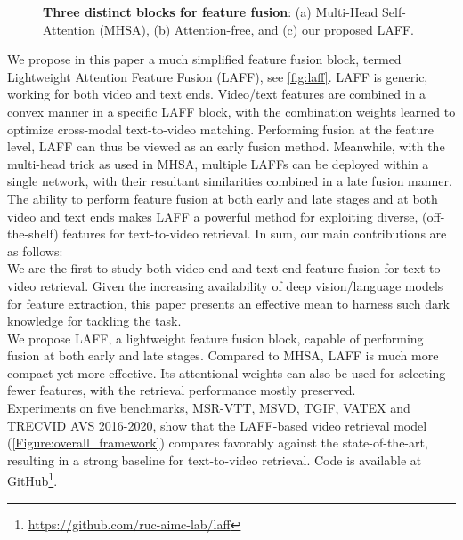 \begin{figure}[htp]

\sbox{}
\setlength{\twosubht}{\ht\twosubbox}



\centering

\hspace{-1pt}
\hspace{8pt}
\caption{\textbf{Three distinct blocks for feature fusion}: (a) Multi-Head Self-Attention (MHSA), (b) Attention-free, and (c) our proposed LAFF.}

\label{Figure:attention_block_vs_multi_head_attention}

\end{figure}

 
We propose in this paper a much simplified feature fusion block, termed Lightweight Attention Feature Fusion (LAFF), see \cref{fig:laff}. LAFF is generic, working for both video and text ends. Video/text features are combined in a convex manner in a specific LAFF block, with the combination weights learned to optimize cross-modal text-to-video matching. Performing fusion at the feature level, LAFF can thus be viewed as an early fusion method. Meanwhile, with the multi-head trick as used in MHSA, multiple LAFFs can be deployed within a single network, with their resultant similarities combined in a late fusion manner. The ability to perform feature fusion at both early and late stages and at both video and text ends makes LAFF a powerful method for exploiting diverse,  (off-the-shelf) features for text-to-video retrieval. In sum, our main contributions are as follows: \\
 We are the first to study both video-end and text-end feature fusion for text-to-video retrieval. Given the increasing availability of deep vision/language models for feature extraction, this paper presents an effective mean to harness such dark knowledge for tackling the task. \\
 We propose LAFF, a lightweight feature fusion block, capable of performing fusion at both early and late stages. Compared to MHSA, LAFF is much more compact yet more effective. Its attentional weights can also be used for selecting fewer features,  with the retrieval performance mostly preserved. \\
 Experiments on five benchmarks, \ie MSR-VTT, MSVD, TGIF, VATEX and TRECVID AVS 2016-2020, show that the LAFF-based video retrieval model (\cref{Figure:overall_framework}) compares favorably against the state-of-the-art, resulting in a  strong baseline for text-to-video retrieval. Code is available at GitHub\footnote{\url{https://github.com/ruc-aimc-lab/laff}}.
